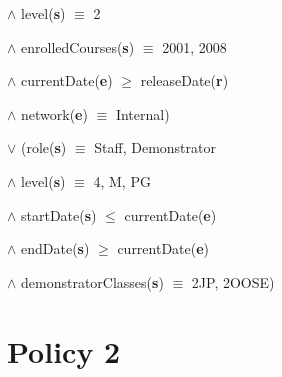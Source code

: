 \documentclass[a4paper,11pt]{article}
\begin{document}
\hspace{2.8cm}$\wedge{}$ level(\textbf{s}) $\equiv$ 2\par
\hspace{2.8cm}$\wedge{}$ enrolledCourses(\textbf{s}) $\equiv$ 2001, 2008\par
\hspace{2.8cm}$\wedge{}$ currentDate(\textbf{e}) $\geq$ releaseDate(\textbf{r})\par
\hspace{2.8cm}$\wedge{}$ network(\textbf{e}) $\equiv$ Internal)\par
\hspace{2.3cm}$\vee{}$ (role(\textbf{s}) $\equiv$ Staff, Demonstrator\par
\hspace{2.8cm}$\wedge{}$ level(\textbf{s}) $\equiv$ 4, M, PG\par
\hspace{2.8cm}$\wedge{}$ startDate(\textbf{s}) $\leq$ currentDate(\textbf{e})\par
\hspace{2.8cm}$\wedge{}$ endDate(\textbf{s}) $\geq$ currentDate(\textbf{e})\par
\hspace{2.8cm}$\wedge{}$ demonstratorClasses(\textbf{s}) $\equiv$ 2JP, 2OOSE)\par

\section{Policy 2}
\end{document}
